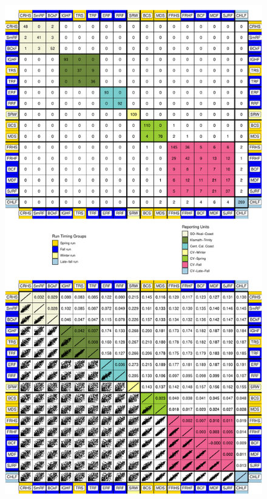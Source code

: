 \begin{figure}
\begin{center}
\includegraphics[width=\columnwidth]{images/gsi_and_fst_fig-crop.pdf}
\end{center}
\caption[\gsicap]{\gsicap}
\label{fig:gsi}
\end{figure}







